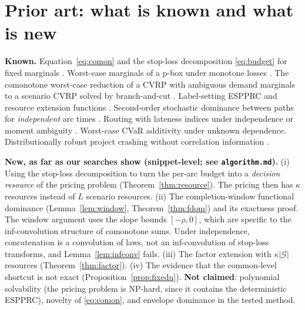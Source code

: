 \documentclass[11pt]{article}
\theoremstyle{definition}
\begin{document}
\section{Prior art: what is known and what is new}\label{sec:prior}

\textbf{Known.} Equation~\eqref{eq:comon} and the stop-loss decomposition \eqref{eq:budget} for fixed marginals \cite{MN79,KDG00,DDGKV02}. Worst-case marginals of a p-box under monotone losses \cite{WD90,Ferson03}. The comonotone worst-case reduction of a CVRP with ambiguous demand marginals to a scenario CVRP solved by branch-and-cut \cite{GHW24}. Label-setting ESPPRC and resource extension functions \cite{FDGG04,ID05}. Second-order stochastic dominance between paths for \emph{independent} arc times \cite{NWH12}. Routing with lateness indices under independence \cite{AJ16} or moment ambiguity \cite{JQS16,ZBST19}. Worst-case CVaR additivity under unknown dependence. Distributionally robust project crashing without correlation information \cite{ANS19}.

\textbf{New, as far as our searches show (snippet-level; see \texttt{algorithm.md}).}
(i) Using the stop-loss decomposition to turn the per-arc budget into a \emph{decision resource} of the pricing problem (Theorem~\ref{thm:resource}). The pricing then has $\kappa$ resources instead of $L$ scenario resources.
(ii) The completion-window functional dominance (Lemma~\ref{lem:window}, Theorem~\ref{thm:fdom}) and its exactness proof. The window argument uses the slope bounds $[-\rho,0]$, which are specific to the inf-convolution structure of comonotone sums. Under independence, concatenation is a convolution of laws, not an inf-convolution of stop-loss transforms, and Lemma~\ref{lem:infconv} fails.
(iii) The factor extension with $\kappa|\mathcal G|$ resources (Theorem~\ref{thm:factor}).
(iv) The evidence that the common-level shortcut is not exact (Proposition~\ref{prop:fixedu}).
\textbf{Not claimed}: polynomial solvability (the pricing problem is NP-hard, since it contains the deterministic ESPPRC), novelty of \eqref{eq:comon}, and envelope dominance in the tested method.
\end{document}
